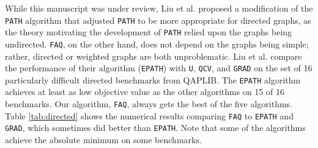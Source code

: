 \documentclass[11pt]{article}
\newcommand{\FAQ}{\texttt{FAQ} }
\begin{document}
While this manuscript was under review, Liu et al. \cite{Liu2012} proposed a modification of the \texttt{PATH} algorithm that adjusted \texttt{PATH} to be more appropriate for directed graphs, as the theory motivating the development of \texttt{PATH} relied upon the graphs being undirected.  \texttt{FAQ}, on the other hand, does not depend on the graphs being simple; rather, directed or weighted graphs are both unproblematic. 
Liu et al. compare the performance of their algorithm (\texttt{EPATH}) with \texttt{U}, \texttt{QCV}, and \texttt{GRAD}
on the set of 16 particularly difficult directed benchmarks from QAPLIB.  The \texttt{EPATH} algorithm achieves at least as low objective value as the other algorithms on 15 of 16 benchmarks.  Our algorithm, \texttt{FAQ}, always gets the best of the five algorithms.  Table \ref{tab:directed} shows the numerical results comparing \FAQ to \texttt{EPATH} and \texttt{GRAD}, which sometimes did better than \texttt{EPATH}.  Note that some of the algorithms achieve the absolute minimum on some benchmarks.  
\end{document}
